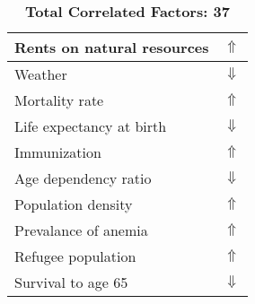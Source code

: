\documentclass[12pt,notitlepage,oneside]{report}
\begin{document}
\begin{table}[!htb]
\begin{tabular}{|l|l|}
Rents on natural resources & $\Uparrow$\\ \hline
Weather & $\Downarrow$\\ \hline
Mortality rate & $\Uparrow$\\ \hline
Life expectancy at birth & $\Downarrow$\\ \hline
Immunization & $\Uparrow$\\ \hline
Age dependency ratio & $\Downarrow$\\ \hline
Population density & $\Uparrow$\\ \hline
Prevalance of anemia & $\Uparrow$\\ \hline
Refugee population & $\Uparrow$\\ \hline
Survival to age 65 & $\Downarrow$\\ \hline
\end{tabular}
\caption*{\textbf{Total Correlated Factors: 37}}
\end{table}
\clearpage
\end{document}
